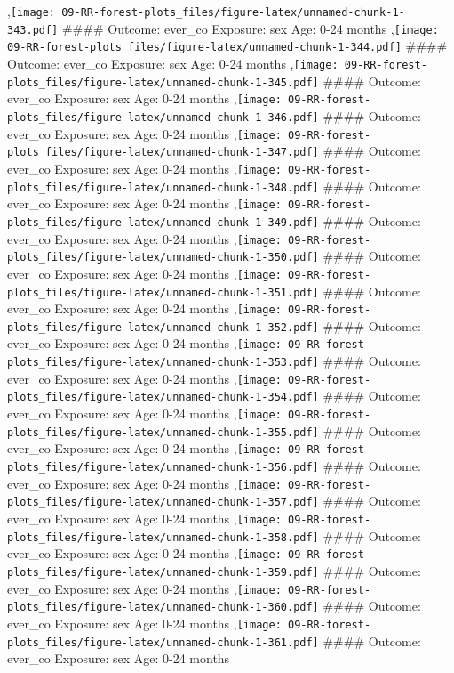 \documentclass[
  9pt,
]{book}
\begin{document}
,\texttt{[image: 09-RR-forest-plots\_files/figure-latex/unnamed-chunk-1-343.pdf]}
\#\#\#\# Outcome: ever\_co Exposure: sex Age: 0-24 months
,\texttt{[image: 09-RR-forest-plots\_files/figure-latex/unnamed-chunk-1-344.pdf]}
\#\#\#\# Outcome: ever\_co Exposure: sex Age: 0-24 months
,\texttt{[image: 09-RR-forest-plots\_files/figure-latex/unnamed-chunk-1-345.pdf]}
\#\#\#\# Outcome: ever\_co Exposure: sex Age: 0-24 months
,\texttt{[image: 09-RR-forest-plots\_files/figure-latex/unnamed-chunk-1-346.pdf]}
\#\#\#\# Outcome: ever\_co Exposure: sex Age: 0-24 months
,\texttt{[image: 09-RR-forest-plots\_files/figure-latex/unnamed-chunk-1-347.pdf]}
\#\#\#\# Outcome: ever\_co Exposure: sex Age: 0-24 months
,\texttt{[image: 09-RR-forest-plots\_files/figure-latex/unnamed-chunk-1-348.pdf]}
\#\#\#\# Outcome: ever\_co Exposure: sex Age: 0-24 months
,\texttt{[image: 09-RR-forest-plots\_files/figure-latex/unnamed-chunk-1-349.pdf]}
\#\#\#\# Outcome: ever\_co Exposure: sex Age: 0-24 months
,\texttt{[image: 09-RR-forest-plots\_files/figure-latex/unnamed-chunk-1-350.pdf]}
\#\#\#\# Outcome: ever\_co Exposure: sex Age: 0-24 months
,\texttt{[image: 09-RR-forest-plots\_files/figure-latex/unnamed-chunk-1-351.pdf]}
\#\#\#\# Outcome: ever\_co Exposure: sex Age: 0-24 months
,\texttt{[image: 09-RR-forest-plots\_files/figure-latex/unnamed-chunk-1-352.pdf]}
\#\#\#\# Outcome: ever\_co Exposure: sex Age: 0-24 months
,\texttt{[image: 09-RR-forest-plots\_files/figure-latex/unnamed-chunk-1-353.pdf]}
\#\#\#\# Outcome: ever\_co Exposure: sex Age: 0-24 months
,\texttt{[image: 09-RR-forest-plots\_files/figure-latex/unnamed-chunk-1-354.pdf]}
\#\#\#\# Outcome: ever\_co Exposure: sex Age: 0-24 months
,\texttt{[image: 09-RR-forest-plots\_files/figure-latex/unnamed-chunk-1-355.pdf]}
\#\#\#\# Outcome: ever\_co Exposure: sex Age: 0-24 months
,\texttt{[image: 09-RR-forest-plots\_files/figure-latex/unnamed-chunk-1-356.pdf]}
\#\#\#\# Outcome: ever\_co Exposure: sex Age: 0-24 months
,\texttt{[image: 09-RR-forest-plots\_files/figure-latex/unnamed-chunk-1-357.pdf]}
\#\#\#\# Outcome: ever\_co Exposure: sex Age: 0-24 months
,\texttt{[image: 09-RR-forest-plots\_files/figure-latex/unnamed-chunk-1-358.pdf]}
\#\#\#\# Outcome: ever\_co Exposure: sex Age: 0-24 months
,\texttt{[image: 09-RR-forest-plots\_files/figure-latex/unnamed-chunk-1-359.pdf]}
\#\#\#\# Outcome: ever\_co Exposure: sex Age: 0-24 months
,\texttt{[image: 09-RR-forest-plots\_files/figure-latex/unnamed-chunk-1-360.pdf]}
\#\#\#\# Outcome: ever\_co Exposure: sex Age: 0-24 months
,\texttt{[image: 09-RR-forest-plots\_files/figure-latex/unnamed-chunk-1-361.pdf]}
\#\#\#\# Outcome: ever\_co Exposure: sex Age: 0-24 months
\end{document}
